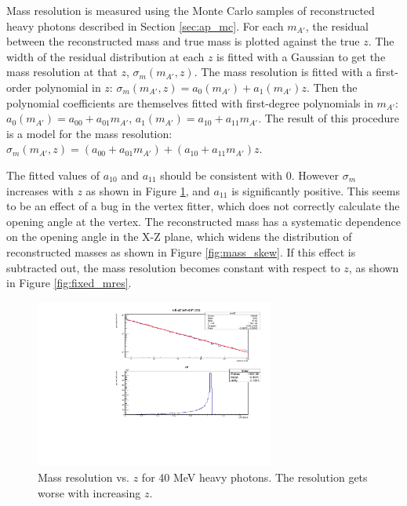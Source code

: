 Mass resolution is measured using the Monte Carlo samples of reconstructed heavy photons described in Section \ref{sec:ap_mc}.
For each $m_{A'}$, the residual between the reconstructed mass and true mass is plotted against the true $z$.
The width of the residual distribution at each $z$ is fitted with a Gaussian to get the mass resolution at that $z$, $\sigma_m(m_{A'},z)$.
The mass resolution is fitted with a first-order polynomial in $z$:
$\sigma_m(m_{A'},z) = a_0(m_{A'}) + a_1(m_{A'}) z$.
Then the polynomial coefficients are themselves fitted with first-degree polynomials in $m_{A'}$: $a_0(m_{A'}) = a_{00} + a_{01}m_{A'}$, $a_1(m_{A'}) = a_{10} + a_{11}m_{A'}$.
The result of this procedure is a model for the mass resolution: $\sigma_m(m_{A'},z) = (a_{00} + a_{01}m_{A'}) + (a_{10} + a_{11}m_{A'}) z$.

The fitted values of $a_{10}$ and $a_{11}$ should be consistent with 0.
However $\sigma_m$ increases with $z$ as shown in Figure \ref{fig:skewed_mres}, and $a_{11}$ is significantly positive.
This seems to be an effect of a bug in the vertex fitter, which does not correctly calculate the opening angle at the vertex.
The reconstructed mass has a systematic dependence on the opening angle in the X-Z plane, which widens the distribution of reconstructed masses as shown in Figure \ref{fig:mass_skew}.
If this effect is subtracted out, the mass resolution becomes constant with respect to $z$, as shown in Figure \ref{fig:fixed_mres}.

\begin{figure}[ht]
\begin{center}
    \includegraphics[width=0.7\textwidth,page=4,angle=-90]{vertexing/figs/acceptance_40}
\end{center}
    \caption{Mass resolution vs. $z$ for 40 MeV heavy photons. The resolution gets worse with increasing $z$.}
    \label{fig:skewed_mres}
\end{figure}

